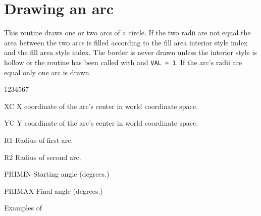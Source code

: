 \newpage
{}
\section{Drawing an arc}
\Action
This routine draws one or two arcs of a circle. If the two radii are not equal the area
between the two arcs is filled according to the fill area interior style index
and the fill area style index. The border is never drawn unless the interior
style is hollow or the routine  has been called with  and
{\tt VAL = 1}. If the arc's radii are equal only one arc is drawn.
\Pdesc
\begin{DLtt}{1234567}
\item[XC]     X coordinate of the arc's center in world coordinate space.
\item[YC]     Y coordinate of the arc's center in world coordinate space.
\item[R1]     Radius of first arc.
\item[R2]     Radius of second arc.
\item[PHIMIN] Starting angle (degrees.)
\item[PHIMAX] Final angle (degrees.)
\end{DLtt}

\begin{Fighere}
\begin{center}\mbox{}\end{center}
\caption{Examples of \protect{}}
\label{fig-FIGU005S}
\end{Fighere}
\vfill
\newpage
{}
